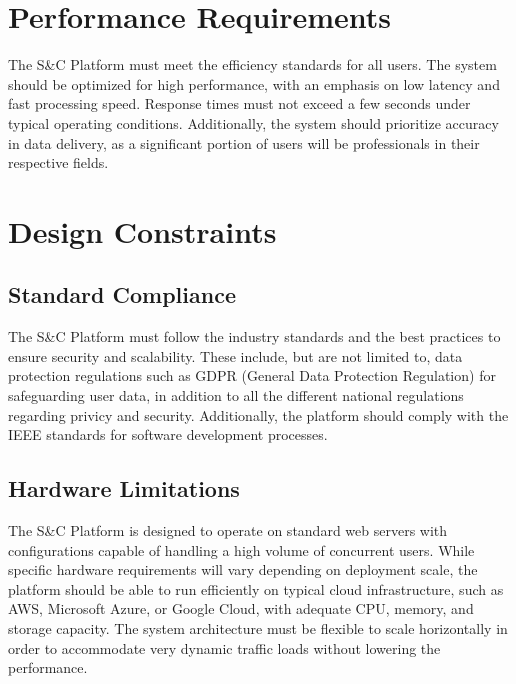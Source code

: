 \section{Performance Requirements}
The S\&C Platform must meet the efficiency standards for all users. 
The system should be optimized for high performance, with an emphasis on low latency and fast processing speed. 
Response times must not exceed a few seconds under typical operating conditions.
 Additionally, the system should prioritize accuracy in data delivery, as a significant portion of users will be professionals in their respective fields.

\section{Design Constraints}

\subsection{Standard Compliance}
The S\&C Platform must follow the industry standards 
and the best practices to ensure security and scalability. 
These include, but are not limited to, 
data protection regulations such as GDPR (General Data Protection Regulation) 
for safeguarding user data, in addition to all the different national regulations regarding privicy and security.
Additionally, the platform should comply with the IEEE standards 
for software development processes.

\subsection{Hardware Limitations}
The S\&C Platform is designed to operate on standard
 web servers with configurations capable of handling a high volume of concurrent users. 
 While specific hardware requirements will vary depending on deployment scale, 
 the platform should be able to run efficiently on typical cloud infrastructure, 
 such as AWS, Microsoft Azure, or Google Cloud, with adequate CPU, memory, and storage capacity. 
 The system architecture must be flexible to scale horizontally in order to accommodate very dynamic traffic loads without lowering the performance.

